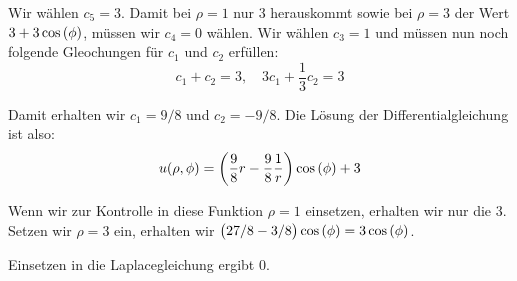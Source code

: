 \documentclass[11pt, ngerman, fleqn]{article}
\begin{document}
Wir wählen $c_5 = 3$. Damit bei $\rho=1$ nur $3$ herauskommt sowie bei $\rho = 3$ der Wert $3 + 3 \cos\del\phi$, müssen wir $c_4=0$ wählen. Wir wählen $c_3 = 1$ und müssen nun noch folgende Gleochungen für $c_1$ und $c_2$ erfüllen:
\[
	c_1 + c_2 = 3
	, \quad
	3 c_1 + \frac 13 c_2 = 3
\]

Damit erhalten wir $c_1 = 9/8$ und $c_2 = - 9/8$. Die Lösung der Differentialgleichung ist also:
\[
	u(\rho, \phi) = \del{\frac 98 r - \frac 98 \frac 1r}\cos\del\phi + 3
\]

Wenn wir zur Kontrolle in diese Funktion $\rho = 1$ einsetzen, erhalten wir nur die $3$. Setzen wir $\rho = 3$ ein, erhalten wir $\del{27/8-3/8}\cos\del\phi = 3 \cos\del\phi$.

Einsetzen in die Laplacegleichung ergibt $0$.

%
%
\end{document}
